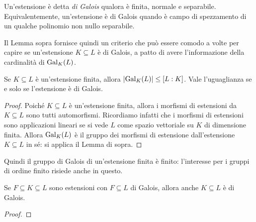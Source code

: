 \begin{defi}
Un'estensione è detta {\em di Galois} qualora è finita, normale e separabile. Equivalentemente, un'estensione è di Galois quando è campo di spezzamento di un qualche polinomio non nullo separabile.
\end{defi}

Il Lemma sopra fornisce quindi un criterio che può essere comodo a volte per capire se un'estensione \(K \subseteq L\) è di Galois, a patto di avere l'informazione della cardinalità di \(\Gal[K]{L}\).

\begin{prop}\label{prop:CardGruppiGalois}
Se \(K \subseteq L\) è un'estensione finita, allora \(\card{\Gal[K]{L}} \le [L:K]\). Vale l'uguaglianza se e solo se l'estensione è di Galois.
\end{prop}

\begin{proof}
Poiché \(K \subseteq L\) è un'estensione finita, allora i morfismi di estensioni da \(K \subseteq L\) sono tutti automorfismi. Ricordiamo infatti che i morfismi di estensioni sono applicazioni lineari se si vede \(L\) come spazio vettoriale su \(K\) di dimensione finita. Allora \(\Gal[K]{L}\) è il gruppo dei morfismi di estensione dall'estensione \(K \subseteq L\) in sé: si applica il Lemma di sopra.
\end{proof}

Quindi il gruppo di Galois di un'estensione finita è finito: l'interesse per i gruppi di ordine finito risiede anche in questo. 

\begin{prop}
Se \(F \subseteq K \subseteq L\) sono estensioni con \(F \subseteq L\) di Galois, allora anche \(K\subseteq L\) è di Galois.
\end{prop}

\begin{proof}
\end{proof}


